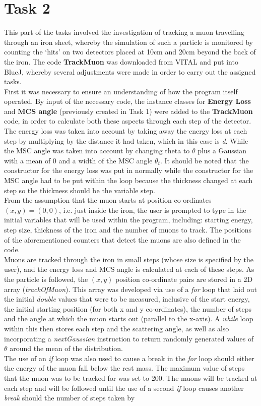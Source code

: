 \documentclass[twocolumn]{article}
\begin{document}
\section{Task 2}
This part of the tasks involved the investigation of tracking a muon travelling through an iron sheet, whereby the simulation of such a particle is monitored by counting the ‘hits’ on two detectors placed at 10cm and 20cm beyond the back of the iron. The code \textbf{TrackMuon} was downloaded from VITAL and put into BlueJ, whereby several adjustments were made in order to carry out the assigned tasks. \\\indent First it was necessary to ensure an understanding of how the program itself operated. By input of the necessary code, the instance classes for \textbf{Energy Loss} and \textbf{MCS angle} (previously created in Task 1) were added to the \textbf{TrackMuon} code, in order to calculate both these aspects through each step of the detector. The energy loss was taken into account by taking away the energy loss at each step by multiplying by the distance it had taken, which in this case is \textit{d}. While the MSC angle was taken into account by changing theta to $\theta$ plus a Gaussian with a mean of 0 and a width of the MSC angle $\theta_t$. It should be noted that the constructor for the energy loss was put in normally while the constructor for the MSC angle had to be put within the loop because the thickness changed at each step so the thickness should be the variable step. \\\indent From the assumption that the muon starts at position co-ordinates $(x, y) = (0, 0)$, i.e. just inside the iron, the user is prompted to type in the initial variables that will be used within the program, including: starting energy, step size, thickness of the iron and the number of muons to track. The positions of the aforementioned counters that detect the muons are also defined in the code. \\\indent Muons are tracked through the iron in small steps (whose size is specified by the user), and the energy loss and MCS angle is calculated at each of these steps. As the particle is followed, the $(x, y)$ position co-ordinate pairs are stored in a 2D array (\textit{trackOfMuon}). This array was developed via use of a \textit{for} loop that laid out the initial \textit{double} values that were to be measured, inclusive of the start energy, the initial starting position (for both x and y co-ordinates), the number of steps and the angle at which the muon starts out (parallel to the x-axis). A \textit{while} loop within this then stores each step and the scattering angle, as well as also incorporating a \textit{nextGaussian} instruction to return randomly generated values of $\theta$ around the mean of the distribution. \\\indent The use of an \textit{if} loop was also used to cause a break in the \textit{for} loop should either the energy of the muon fall below the rest mass. The maximum value of steps that the muon was to be tracked for was set to 200. The muons will be tracked at each step and will be followed until the use of a second \textit{if} loop causes another \textit{break} should the number of steps taken by 
\end{document}
